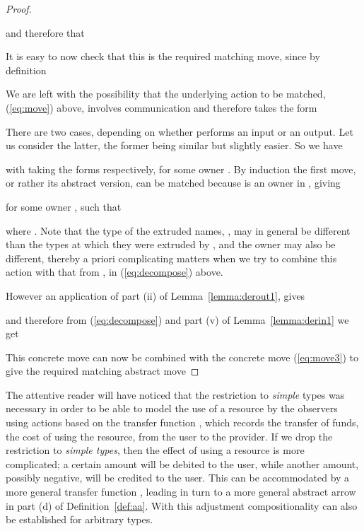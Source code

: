 \documentclass{LMCS}
\begin{document}
\begin{proof}
\begin{enumerate}[(a)]
and therefore that 

It is easy to now check that this is the required matching move, since by definition


\end{enumerate}

We are left with the possibility that the underlying action to be matched, (\ref{eq:move}) 
above, involves
communication and therefore takes the form

There are two cases, depending on whether  performs an input or an output. Let us consider the
latter, the former being similar but slightly easier. So we have

with  taking the forms  respectively, for some owner .  
By induction the first move, or rather its abstract version,  can be matched  because  is an owner in , giving 

for some owner , such that 

where . 
Note that the type of the extruded names, , may in general be different than the
types at which they were extruded by , and the owner  may also be different,
thereby a priori complicating matters when we try to combine this action with that from , 
in (\ref{eq:decompose})
above. 

However an application of part (ii) of Lemma~\ref{lemma:derout1}, gives 

and therefore from (\ref{eq:decompose}) and part (v) of Lemma~\ref{lemma:derin1} we get

This concrete move can now be combined with the concrete move (\ref{eq:move3}) to give the required matching
abstract move

\end{proof}
The attentive reader will have noticed that the restriction to \emph{simple} types
was necessary in order to be able to model the use of a resource by  the observers using actions
based on the transfer function 
, which records the transfer of
 funds, the cost of using the resource, from the user to the provider. 
If we drop the restriction  to \emph{simple types},  then the effect of using a resource is more complicated;
a certain amount will be debited to the user, while another  amount, possibly negative,
will be credited to the user. This can be accommodated by a more general transfer function
, leading in turn to a more general abstract arrow in
part (d) of Definition~\ref{def:aa}. With this adjustment compositionality can also be established
for arbitrary types. 
\end{document}
